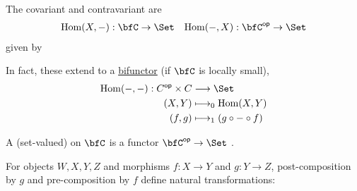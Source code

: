 \documentclass[a5paper]{article}
\newcommand*{\comma}{,}
\newcommand*{\linktoo}[2]{\hyperref[#1]{#2}}
\begin{document}
\begin{definition}
  The covariant and contravariant 
  are
  \begin{align*}
    \Hom(X,-):\bfC\to\Set
    &&
    \Hom(-,X):\bfC^{\op}\to\Set
  \end{align*}
  given by
  \begin{center}
  \begin{minipage}[b]{0.48\linewidth}
    \centering
  \end{minipage}
  \begin{minipage}[b]{0.48\linewidth}
    \centering
  \end{minipage}
  \end{center}
  In fact, these extend to a \linktoo{def:bifunctor}{bifunctor} (if $\bfC$ is
  locally small),
  \begin{align*}
    \Hom(-,-):C^{\op}\times C &\longrightarrow \Set \\
    (X,Y) &\longmapsto_0 \Hom(X,Y) \\
    (f,g) &\longmapsto_1 (g\circ -\circ f)
  \end{align*}
\end{definition}

\begin{definition}\label{def:presheaf}
  A (set-valued)  on $\bfC$ is a functor
  $\bfC^{\op}\to\Set$ \cite{nlab:presheaf}.
\end{definition}

For objects $W,X,Y,Z$ and morphisms $f:X\to Y$ and $g:Y\to Z$, post-composition
by $g$ and pre-composition by $f$ define natural transformations:
\begin{center}
\end{center}
\end{document}
